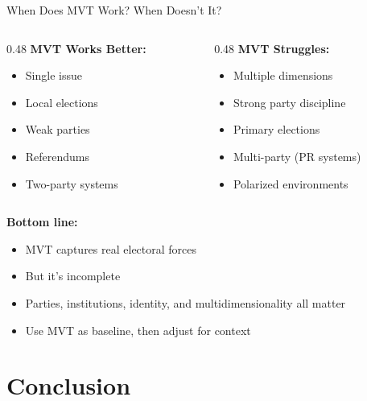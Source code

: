 \documentclass[10pt]{beamer}
\begin{document}
\begin{frame}{When Does MVT Work? When Doesn't It?}
\begin{columns}
\begin{column}{0.48\textwidth}
\textbf{MVT Works Better:}
\begin{itemize}
\item Single issue
\item Local elections
\item Weak parties
\item Referendums
\item Two-party systems
\end{itemize}
\end{column}


\begin{column}{0.48\textwidth}
\textbf{MVT Struggles:}
\begin{itemize}
\item Multiple dimensions
\item Strong party discipline
\item Primary elections
\item Multi-party (PR systems)
\item Polarized environments
\end{itemize}
\end{column}
\end{columns}



\textbf{Bottom line:}
\begin{itemize}
\item MVT captures real electoral forces
\item But it's \alert{incomplete}
\item Parties, institutions, identity, and multidimensionality all matter
\item Use MVT as baseline, then adjust for context
\end{itemize}
\end{frame}

\section{Conclusion}
\end{document}
